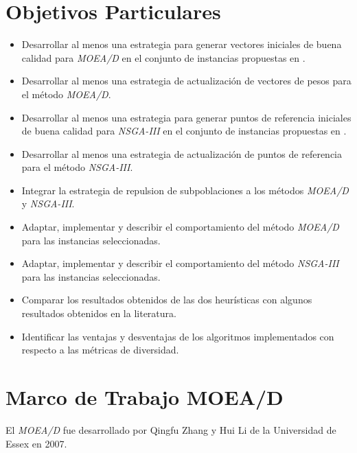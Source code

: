 \documentclass[letterpaper,10pt]{article}
\begin{document}
\section{Objetivos Particulares}

\begin{itemize}
\item Desarrollar al menos una estrategia para generar vectores iniciales de buena calidad para \emph{MOEA/D} en el conjunto de instancias propuestas en \cite{zhang2008multiobjective}.

\item Desarrollar al menos una estrategia de actualización de vectores de pesos para el método \emph{MOEA/D}.

\item Desarrollar al menos una estrategia para generar puntos de referencia iniciales de buena calidad para \emph{NSGA-III} en el conjunto de instancias propuestas en \cite{zhang2008multiobjective}.

\item Desarrollar al menos una estrategia de actualización de puntos de referencia para el método \emph{NSGA-III}.

\item Integrar la estrategia de repulsion de subpoblaciones\cite{ahrari2016multimodal} a los métodos \emph{MOEA/D} y \emph{NSGA-III}.

\item Adaptar, implementar y describir el comportamiento del método \emph{MOEA/D} para las instancias seleccionadas.
 
\item Adaptar, implementar y describir el comportamiento del método \emph{NSGA-III} para las instancias seleccionadas.

\item Comparar los resultados obtenidos de las dos heurísticas con algunos resultados obtenidos en la literatura.

\item Identificar las ventajas y desventajas de los algoritmos implementados con respecto a las métricas de diversidad.
\end{itemize}

\section{Marco de Trabajo MOEA/D}
El \emph{MOEA/D} fue desarrollado por Qingfu Zhang y Hui Li de la Universidad de Essex en 2007. \cite{4358754}
 
\end{document}
